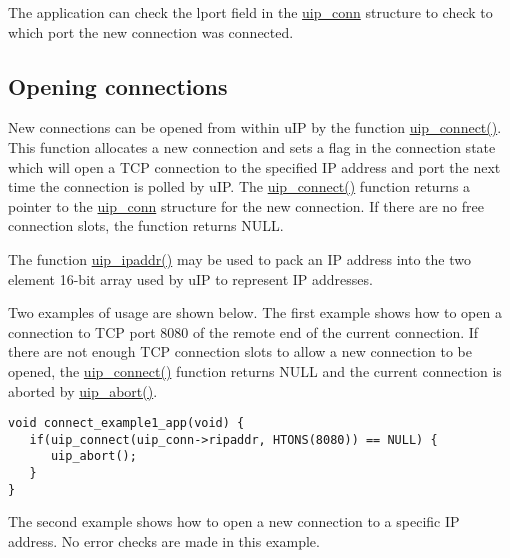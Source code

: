 The application can check the lport field in the \hyperlink{a00028}{uip\_\-conn} structure to check to which port the new connection was connected.\hypertarget{main_connect}{}\subsection{Opening connections}\label{main_connect}
New connections can be opened from within u\-IP by the function \hyperlink{a00064_gce715881b240922bba96613c2a88fd67}{uip\_\-connect()}. This function allocates a new connection and sets a flag in the connection state which will open a TCP connection to the specified IP address and port the next time the connection is polled by u\-IP. The \hyperlink{a00064_gce715881b240922bba96613c2a88fd67}{uip\_\-connect()} function returns a pointer to the \hyperlink{a00028}{uip\_\-conn} structure for the new connection. If there are no free connection slots, the function returns NULL.

The function \hyperlink{a00065_g87f0b54ade0d159fba495089128a4932}{uip\_\-ipaddr()} may be used to pack an IP address into the two element 16-bit array used by u\-IP to represent IP addresses.

Two examples of usage are shown below. The first example shows how to open a connection to TCP port 8080 of the remote end of the current connection. If there are not enough TCP connection slots to allow a new connection to be opened, the \hyperlink{a00064_gce715881b240922bba96613c2a88fd67}{uip\_\-connect()} function returns NULL and the current connection is aborted by \hyperlink{a00064_g88d2ccf7cd821f89d9a8df7e3948b56c}{uip\_\-abort()}.



\footnotesize\begin{verbatim}void connect_example1_app(void) {
   if(uip_connect(uip_conn->ripaddr, HTONS(8080)) == NULL) {
      uip_abort();
   }
}   
\end{verbatim}
\normalsize


The second example shows how to open a new connection to a specific IP address. No error checks are made in this example.



